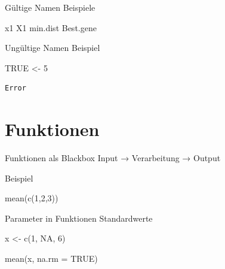 \documentclass[
  10pt,
  ignorenonframetext,
  aspectratio=169,
]{beamer}
\newenvironment{Shaded}{}{}
\newcommand{\AttributeTok}[1]{\textcolor[rgb]{0.49,0.56,0.16}{#1}}
\newcommand{\ConstantTok}[1]{\textcolor[rgb]{0.53,0.00,0.00}{#1}}
\newcommand{\DecValTok}[1]{\textcolor[rgb]{0.25,0.63,0.44}{#1}}
\newcommand{\FunctionTok}[1]{\textcolor[rgb]{0.02,0.16,0.49}{#1}}
\newcommand{\NormalTok}[1]{#1}
\newcommand{\OtherTok}[1]{\textcolor[rgb]{0.00,0.44,0.13}{#1}}
\begin{document}
\begin{frame}[fragile]{Gültige Namen}
\label{guxfcltige-namen}
Beispiele

\begin{Shaded}
\begin{Highlighting}[]
\NormalTok{x1}
\NormalTok{X1}
\NormalTok{min.dist}
\NormalTok{Best.gene}
\end{Highlighting}
\end{Shaded}
\end{frame}

\begin{frame}[fragile]{Ungültige Namen}
\label{unguxfcltige-namen}
Beispiel

\begin{Shaded}
\begin{Highlighting}[]
\NormalTok{TRUE \textless{}{-} 5}
\end{Highlighting}
\end{Shaded}

\begin{verbatim}
Error
\end{verbatim}
\end{frame}

\begin{frame}
\end{frame}

\section{Funktionen}\label{funktionen}

\begin{frame}[fragile]{Funktionen als Blackbox}
\label{funktionen-als-blackbox}
Input → Verarbeitung → Output

Beispiel

\begin{Shaded}
\begin{Highlighting}[]
\FunctionTok{mean}\NormalTok{(}\FunctionTok{c}\NormalTok{(}\DecValTok{1}\NormalTok{,}\DecValTok{2}\NormalTok{,}\DecValTok{3}\NormalTok{))}
\end{Highlighting}
\end{Shaded}
\end{frame}

\begin{frame}[fragile]{Parameter in Funktionen}
\label{parameter-in-funktionen}
Standardwerte

\begin{Shaded}
\begin{Highlighting}[]
\NormalTok{x }\OtherTok{\textless{}{-}} \FunctionTok{c}\NormalTok{(}\DecValTok{1}\NormalTok{, }\ConstantTok{NA}\NormalTok{, }\DecValTok{6}\NormalTok{)}

\FunctionTok{mean}\NormalTok{(x, }\AttributeTok{na.rm =} \ConstantTok{TRUE}\NormalTok{)}
\end{Highlighting}
\end{Shaded}
\end{frame}
\end{document}
